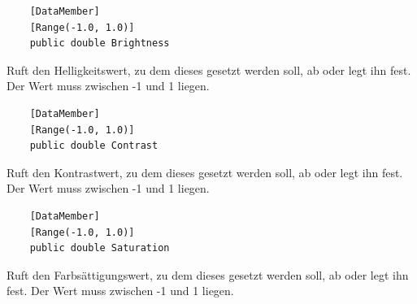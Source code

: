 \begin{itemize}

	\begin{verbatim}
	[DataMember]
	[Range(-1.0, 1.0)]
	public double Brightness
	\end{verbatim}
	Ruft den Helligkeitswert, zu dem dieses  gesetzt werden soll, ab oder legt ihn fest. Der Wert muss zwischen -1 und 1 liegen.
	
	\begin{verbatim}
	[DataMember]
	[Range(-1.0, 1.0)]
	public double Contrast
	\end{verbatim}
	Ruft den Kontrastwert, zu dem dieses  gesetzt werden soll, ab oder legt ihn fest. Der Wert muss zwischen -1 und 1 liegen.
	
	\begin{verbatim}
	[DataMember]
	[Range(-1.0, 1.0)]
	public double Saturation
	\end{verbatim}
	Ruft den Farbsättigungswert, zu dem dieses  gesetzt werden soll, ab oder legt ihn fest. Der Wert muss zwischen -1 und 1 liegen.


\end{itemize}

